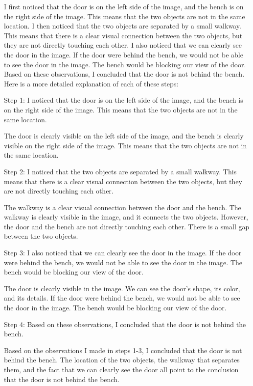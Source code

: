 \begin{enumerate}
        I first noticed that the door is on the left side of the image, and the bench is on the right side of the image. This means that the two objects are not in the same location.
        I then noticed that the two objects are separated by a small walkway. This means that there is a clear visual connection between the two objects, but they are not directly touching each other.
        I also noticed that we can clearly see the door in the image. If the door were behind the bench, we would not be able to see the door in the image. The bench would be blocking our view of the door.
        Based on these observations, I concluded that the door is not behind the bench.
        Here is a more detailed explanation of each of these steps:
        
        Step 1: I noticed that the door is on the left side of the image, and the bench is on the right side of the image. This means that the two objects are not in the same location.
        
        The door is clearly visible on the left side of the image, and the bench is clearly visible on the right side of the image. This means that the two objects are not in the same location.
        
        Step 2: I noticed that the two objects are separated by a small walkway. This means that there is a clear visual connection between the two objects, but they are not directly touching each other.
        
        The walkway is a clear visual connection between the door and the bench. The walkway is clearly visible in the image, and it connects the two objects. However, the door and the bench are not directly touching each other. There is a small gap between the two objects.
        
        Step 3: I also noticed that we can clearly see the door in the image. If the door were behind the bench, we would not be able to see the door in the image. The bench would be blocking our view of the door.
        
        The door is clearly visible in the image. We can see the door's shape, its color, and its details. If the door were behind the bench, we would not be able to see the door in the image. The bench would be blocking our view of the door.
        
        Step 4: Based on these observations, I concluded that the door is not behind the bench.
        
        Based on the observations I made in steps 1-3, I concluded that the door is not behind the bench. The location of the two objects, the walkway that separates them, and the fact that we can clearly see the door all point to the conclusion that the door is not behind the bench.
        

\end{enumerate}
